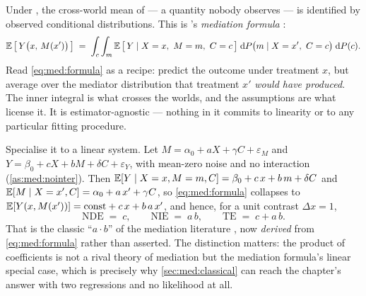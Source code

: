 Under , the cross-world mean of
 --- a quantity nobody observes --- is identified by observed
conditional distributions. This is \citeauthor{pearl2001}'s \emph{mediation formula}
\citep{pearl2001, imai2010}:
%
\begin{equation}
  \operatorname{\mathbb{E}}\big[\,Y\big(x,\,M(x')\big)\,\big] \;=\;
  \int_c \int_m \operatorname{\mathbb{E}}\big[\,Y \mid X = x,\ M = m,\ C = c\,\big]\;
  \mathrm dP\big(m \mid X = x',\ C = c\big)\; \mathrm dP(c).
  \label{eq:med:formula}
\end{equation}
%
Read \cref{eq:med:formula} as a recipe: predict the outcome under treatment $x$, but average over the
mediator distribution that treatment $x'$ \emph{would have produced}. The inner integral is what
crosses the worlds, and the assumptions are what license it. It is estimator-agnostic --- nothing in
it commits to linearity or to any particular fitting procedure.

Specialise it to a linear system. Let $M = \alpha_0 + a X + \gamma C + \varepsilon_M$ and
$Y = \beta_0 + c X + b M + \delta C + \varepsilon_Y$, with mean-zero noise and no interaction
(\cref{as:med:nointer}). Then $\operatorname{\mathbb{E}}[Y \mid X = x, M = m, C] = \beta_0 + c\,x + b\,m + \delta C$ and
$\operatorname{\mathbb{E}}[M \mid X = x', C] = \alpha_0 + a\,x' + \gamma C$, so \cref{eq:med:formula} collapses to
$\operatorname{\mathbb{E}}[Y(x, M(x'))] = \text{const} + c\,x + b\,a\,x'$, and hence, for a unit contrast
$\Delta x = 1$,
%
\begin{equation}
  \boxed{\ \text{NDE} \;=\; c, \qquad \text{NIE} \;=\; a\,b, \qquad \text{TE} \;=\; c + a\,b.\ }
  \label{eq:med:product}
\end{equation}
%
That is the classic ``$a \cdot b$'' of the mediation literature \citep{baron1986}, now
\emph{derived} from \cref{eq:med:formula} rather than asserted. The distinction matters: the product
of coefficients is not a rival theory of mediation but the mediation formula's linear special case,
which is precisely why \cref{sec:med:classical} can reach the chapter's answer with two regressions
and no likelihood at all.


